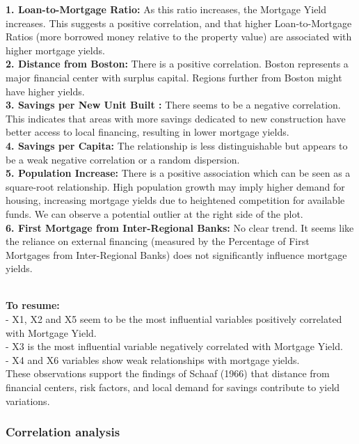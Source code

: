 \documentclass[
  11pt,
]{article}
\begin{document}
\textbf{1. Loan-to-Mortgage Ratio:} As this ratio increases, the
Mortgage Yield increases. This suggests a positive correlation, and that
higher Loan-to-Mortgage Ratios (more borrowed money relative to the
property value) are associated with higher mortgage yields.\\
\textbf{2. Distance from Boston:} There is a positive correlation.
Boston represents a major financial center with surplus capital. Regions
further from Boston might have higher yields.\\
\textbf{3. Savings per New Unit Built :} There seems to be a negative
correlation. This indicates that areas with more savings dedicated to
new construction have better access to local financing, resulting in
lower mortgage yields.\\
\textbf{4. Savings per Capita:} The relationship is less distinguishable
but appears to be a weak negative correlation or a random dispersion.\\
\textbf{5. Population Increase:} There is a positive association which
can be seen as a square-root relationship. High population growth may
imply higher demand for housing, increasing mortgage yields due to
heightened competition for available funds. We can observe a potential
outlier at the right side of the plot.\\
\textbf{6. First Mortgage from Inter-Regional Banks:} No clear trend. It
seems like the reliance on external financing (measured by the
Percentage of First Mortgages from Inter-Regional Banks) does not
significantly influence mortgage yields.\\
\strut \\
\textbf{To resume:}\\
- X1, X2 and X5 seem to be the most influential variables positively
correlated with Mortgage Yield.\\
- X3 is the most influential variable negatively correlated with
Mortgage Yield.\\
- X4 and X6 variables show weak relationships with mortgage yields.\\
These observations support the findings of Schaaf (1966) that distance
from financial centers, risk factors, and local demand for savings
contribute to yield variations.\\

\subsubsection{Correlation analysis}\label{correlation-analysis}
\end{document}
